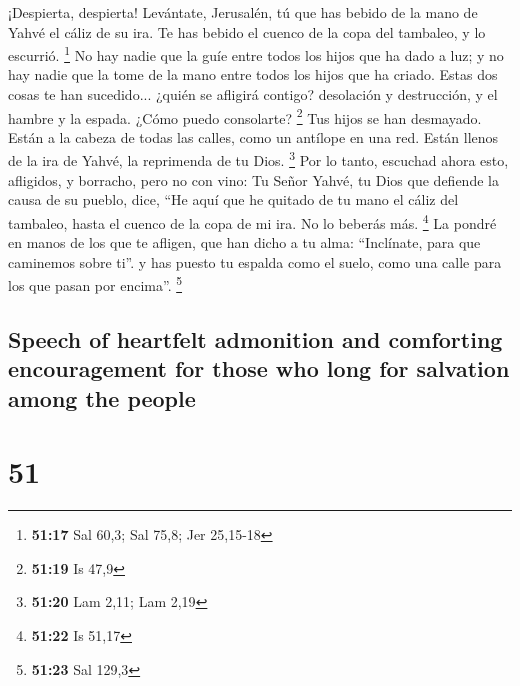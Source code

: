 \begin{paracol}{2}
 ¡Despierta, despierta! Levántate, Jerusalén, tú que has
bebido de la mano de Yahvé el cáliz de su ira. Te has bebido el cuenco
de la copa del tambaleo, y lo escurrió. \footnote{\textbf{51:17} Sal
  60,3; Sal 75,8; Jer 25,15-18}  No hay nadie que la guíe
entre todos los hijos que ha dado a luz; y no hay nadie que la tome de
la mano entre todos los hijos que ha criado.  Estas dos
cosas te han sucedido... ¿quién se afligirá contigo? desolación y
destrucción, y el hambre y la espada. ¿Cómo puedo consolarte?
\footnote{\textbf{51:19} Is 47,9}  Tus hijos se han
desmayado. Están a la cabeza de todas las calles, como un antílope en
una red. Están llenos de la ira de Yahvé, la reprimenda de tu Dios.
\footnote{\textbf{51:20} Lam 2,11; Lam 2,19}  Por lo
tanto, escuchad ahora esto, afligidos, y borracho, pero no con vino:
 Tu Señor Yahvé, tu Dios que defiende la causa de su
pueblo, dice, ``He aquí que he quitado de tu mano el cáliz del tambaleo,
hasta el cuenco de la copa de mi ira. No lo beberás más. \footnote{\textbf{51:22}
  Is 51,17}  La pondré en manos de los que te afligen,
que han dicho a tu alma: ``Inclínate, para que caminemos sobre ti''. y
has puesto tu espalda como el suelo, como una calle para los que pasan
por encima''. \footnote{\textbf{51:23} Sal 129,3}

\switchcolumn
\begin{otherlanguage}{english}

\hypertarget{speech-of-heartfelt-admonition-and-comforting-encouragement-for-those-who-long-for-salvation-among-the-people}{%
\subsection{Speech of heartfelt admonition and comforting encouragement
for those who long for salvation among the
people}\label{speech-of-heartfelt-admonition-and-comforting-encouragement-for-those-who-long-for-salvation-among-the-people}}

\hypertarget{section-101}{%
\section{51}\label{section-101}}


\end{otherlanguage}
\end{paracol}
